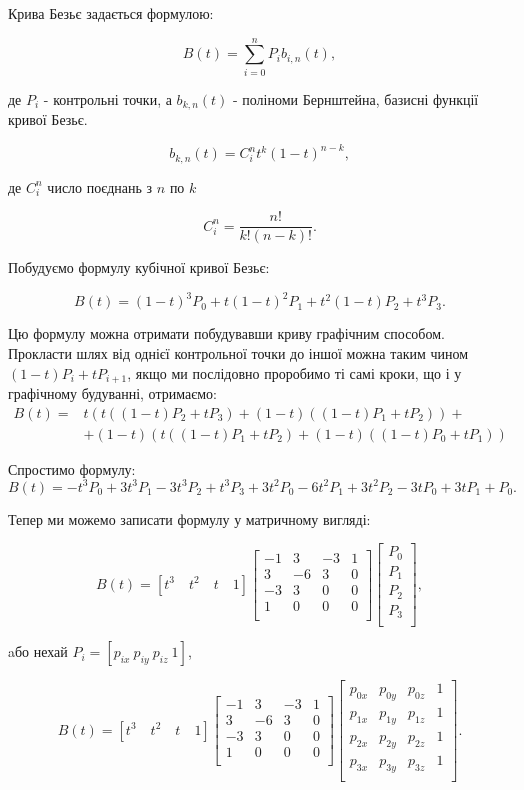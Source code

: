 \let\mypdfximage\pdfximage\def\pdfximage{\immediate\mypdfximage}\documentclass[14pt,a4paper]{extarticle}
\theoremstyle{definition}
\renewcommand{\[}{\begin{singlespace}\begin{equation*}}
\renewcommand{\]}{\end{equation*}\end{singlespace}}
\renewcommand{\+}{\discretionary{\mbox{\scriptsize$\hookleftarrow$}}{}{}}
\begin{document}
Крива Безьє задається формулою:
\[B(t)=\sum_{i=0}^n P_i b_{i,n}(t),\]
де $P_i$ - контрольні точки, а $b_{k,n}(t)$ - поліноми Бернштейна, базисні функції кривої Безьє.
\[b_{k,n}(t)=C_i^nt^k(1-t)^{n-k},\]
де $C_i^n$ число поєднань з $n$ по $k$
\[C_i^n=\frac{n!}{k!(n-k)!}.\]

Побудуємо формулу кубічної кривої Безьє:
\[B(t)=(1-t)^3P_0+t(1-t)^2P_1+t^2(1-t)P_2+t^3P_3.\]

Цю формулу можна отримати побудувавши криву графічним способом. Прокласти шлях від однієї контрольної точки до іншої можна таким чином $(1-t)P_i+tP_{i+1}$, якщо ми послідовно проробимо ті самі кроки, що і у графічному будуванні, отримаємо:
\begin{align*}
B(t)=&t (t ((1 - t) P_{2} + t P_{3}) + (1 - t) ((1 - t) P_{1} + t P_{2})) +\\
&+(1 - t) (t ((1 - t) P_{1} + t P_{2}) + (1 - t) ((1 - t) P_{0} + t P_{1}))
\end{align*}

Спростимо формулу:
\begin{equation}
\label{eq:bezier_curve}
B(t) = -t^3P_0+3t^3P_1-3t^3P_2+t^3P_3 + 3t^2P_0-6t^2P_1+3t^2P_2 - 3tP_0+3tP_1 + P_0.
\end{equation}

Тепер ми можемо записати формулу у матричному вигляді:
\[B(t)=[t^3\quad t^2\quad t\quad 1]\left[\begin{matrix}
-1 &  3 & -3 & 1 \\
 3 & -6 &  3 & 0 \\
-3 &  3 &  0 & 0 \\
 1 &  0 &  0 & 0 \\
\end{matrix}\right]\left[\begin{matrix}
P_0 \\ P_1 \\ P_2 \\ P_3 \\
\end{matrix}\right],\]
aбо нехай $P_i = [p_{ix}\ p_{iy}\ p_{iz}\ 1]$,
\[B(t)=[t^3\quad t^2\quad t\quad 1]\left[\begin{matrix}
-1 &  3 & -3 & 1 \\
 3 & -6 &  3 & 0 \\
-3 &  3 &  0 & 0 \\
 1 &  0 &  0 & 0 \\
\end{matrix}\right]\left[\begin{matrix}
p_{0x} & p_{0y} & p_{0z} & 1 \\
p_{1x} & p_{1y} & p_{1z} & 1 \\
p_{2x} & p_{2y} & p_{2z} & 1 \\
p_{3x} & p_{3y} & p_{3z} & 1 \\
\end{matrix}\right].\]
\end{document}
